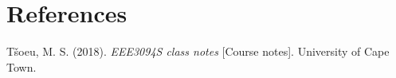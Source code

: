 \documentclass[12pt,a4paper]{article}
\begin{document}

\tableofcontents
\newpage
\setcounter{page}{1}






\section*{References}

\begingroup
\setlength{\parindent}{0pt}
\setlength{\parskip}{8pt}

\hangindent=0.5in 
T\v{s}oeu, M. S. (2018). \emph{EEE3094S class notes} [Course notes]. University of Cape Town.
\par
\endgroup

\appendix

\end{document}
